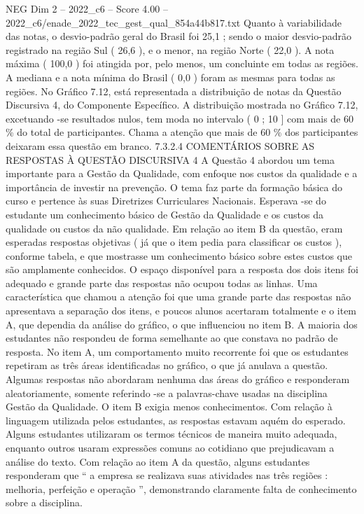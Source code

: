 \begin{textsample}{NEG Dim 2 – 2022\_c6 – Score 4.00 – 2022\_c6/enade\_2022\_tec\_gest\_qual\_854a44b817.txt}
Quanto à variabilidade das notas, o desvio-padrão geral do Brasil foi 25,1 ; sendo o maior desvio-padrão registrado na região Sul ( 26,6 ), e o menor, na região Norte ( 22,0 ).
A nota máxima ( 100,0 ) foi atingida por, pelo menos, um concluinte em todas as regiões.
A mediana e a nota mínima do Brasil ( 0,0 ) foram as mesmas para todas as regiões.
No Gráfico 7.12, está representada a distribuição de notas da Questão Discursiva 4, do Componente Específico.
A distribuição mostrada no Gráfico 7.12, excetuando -se resultados nulos, tem moda no intervalo ( 0 ; 10 ] com mais de 60 \% do total de participantes.
Chama a atenção que mais de 60 \% dos participantes deixaram essa questão em branco. 7.3.2.4 COMENTÁRIOS SOBRE AS RESPOSTAS À QUESTÃO DISCURSIVA 4 A Questão 4 abordou um tema importante para a Gestão da Qualidade, com enfoque nos custos da qualidade e a importância de investir na prevenção.
O tema faz parte da formação básica do curso e pertence às suas Diretrizes Curriculares Nacionais.
Esperava -se do estudante um conhecimento básico de Gestão da Qualidade e os custos da qualidade ou custos da não qualidade.
Em relação ao item B da questão, eram esperadas respostas objetivas ( já que o item pedia para classificar os custos ), conforme tabela, e que mostrasse um conhecimento básico sobre estes custos que são amplamente conhecidos.
O espaço disponível para a resposta dos dois itens foi adequado e grande parte das respostas não ocupou todas as linhas.
Uma característica que chamou a atenção foi que uma grande parte das respostas não apresentava a separação dos itens, e poucos alunos acertaram totalmente e o item A, que dependia da análise do gráfico, o que influenciou no item B.
A maioria dos estudantes não respondeu de forma semelhante ao que constava no padrão de resposta.
No item A, um comportamento muito recorrente foi que os estudantes repetiram as três áreas identificadas no gráfico, o que já anulava a questão.
Algumas respostas não abordaram nenhuma das áreas do gráfico e responderam aleatoriamente, somente referindo -se a palavras-chave usadas na disciplina Gestão da Qualidade.
O item B exigia menos conhecimentos.
Com relação à linguagem utilizada pelos estudantes, as respostas estavam aquém do esperado.
Alguns estudantes utilizaram os termos técnicos de maneira muito adequada, enquanto outros usaram expressões comuns ao cotidiano que prejudicavam a análise do texto.
Com relação ao item A da questão, alguns estudantes responderam que “ a empresa se realizava suas atividades nas três regiões : melhoria, perfeição e operação ”, demonstrando claramente falta de conhecimento sobre a disciplina.

\end{textsample}
